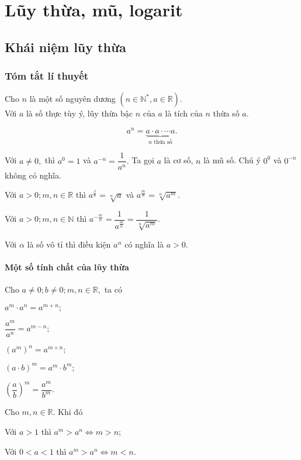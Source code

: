 
\chapter{Lũy thừa, mũ, logarit}
\section{Khái niệm lũy thừa}
\subsection{Tóm tắt lí thuyết}
\begin{dn}
	Cho $n$ là một số nguyên dương $(n \in\mathbb{N}^*, a \in\mathbb{R} )$.\\
	Với $a$ là số thực tùy ý, lũy thừa bậc $n$ của $a$ là tích của $n$ thừa số $a.$
\end{dn}
$$a^n=\underbrace{a \cdot a \cdot \cdots a}_{n \text{ thừa số}}.$$
\begin{listEX}
	\item Với $ a \neq 0, $ thì	$ a^0=1 $ và $ a^{-n}=\dfrac{1}{a^n}. $ Ta gọi $a$ là cơ số, $n$ là mũ số. Chú ý $0^0$ và $0^{-n}$ không có nghĩa.
	\item Với $ a>0; m,n \in\mathbb{R} $  thì $ a^{\frac{1}{n}}=\sqrt[n]{a}$ và $a^{\frac{m}{n}}=\sqrt[n]{a^m}.$
	\item Với $ a >0; m,n \in\mathbb{N} $ thì $a^{-\frac{m}{n}} = \dfrac{1}{a^{\frac{m}{n}}}=\dfrac{1}{\sqrt[n]{a^m}}.$
	\item Với $\alpha$ là số vô tỉ thì điều kiện $a^{\alpha}$ có nghĩa là $ a>0.$
\end{listEX}

\subsubsection{Một số tính chất của lũy thừa}
Cho $ a \neq 0; b \neq 0; m,n \in\mathbb{R}, $ ta có
\begin{listEX}[3]
	\item $ a^m \cdot a^n = a^{m+n}; $
	\item $ \dfrac{a^m}{a^n} = a^{m-n}; $
	\item $ \left(a^m\right)^n = a^{m \times n}; $
	\item $ (a \cdot b)^m = a^m \cdot b^m;$
	\item $ \left(\dfrac{a}{b}\right)^m = \dfrac{a^m}{b^m}.$
\end{listEX}
Cho $ m, n \in\mathbb{R}.$ Khi đó
\begin{listEX}
	\item Với $ a>1$ thì $ a^m>a^n \Leftrightarrow m>n;$
	\item Với $ 0<a<1$ thì $ a^m>a^n \Leftrightarrow m<n.$
\end{listEX}
